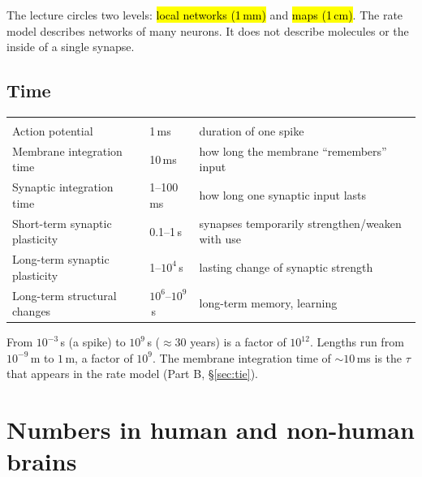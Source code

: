 \begin{intuition}
The lecture circles two levels: \hl{local networks (1\,mm)} and \hl{maps (1\,cm)}. The rate model describes
networks of many neurons. It does not describe molecules or the inside of a single synapse.
\end{intuition}

\subsection{Time}

\begin{center}
\renewcommand{\arraystretch}{1.25}
\begin{tabular}{>{}l l L{6.2cm}}
 &  & \\
 \color{surface}Action potential & 1\,ms & duration of one spike\\
 \color{surface}Membrane integration time & 10\,ms & how long the membrane ``remembers'' input\\
 \color{surface}Synaptic integration time & 1--100\,ms & how long one synaptic input lasts\\
 \color{surface}Short-term synaptic plasticity & 0.1--1\,s & synapses temporarily strengthen/weaken with use\\
 \color{surface}Long-term synaptic plasticity & 1--$10^4$\,s & lasting change of synaptic strength\\
 \color{surface}Long-term structural changes & $10^6$--$10^9$\,s & long-term memory, learning\\
\end{tabular}
\end{center}

\begin{example}
From $10^{-3}$\,s (a spike) to $10^{9}$\,s ($\approx 30$ years) is a factor of $10^{12}$. Lengths run from $10^{-9}$\,m to $1$\,m,
a factor of $10^{9}$. The membrane integration time of $\sim10$\,ms is the $\tau$ that appears in the rate model
(Part B, \S\ref{sec:tie}).
\end{example}

\section{Numbers in human and non-human brains}

